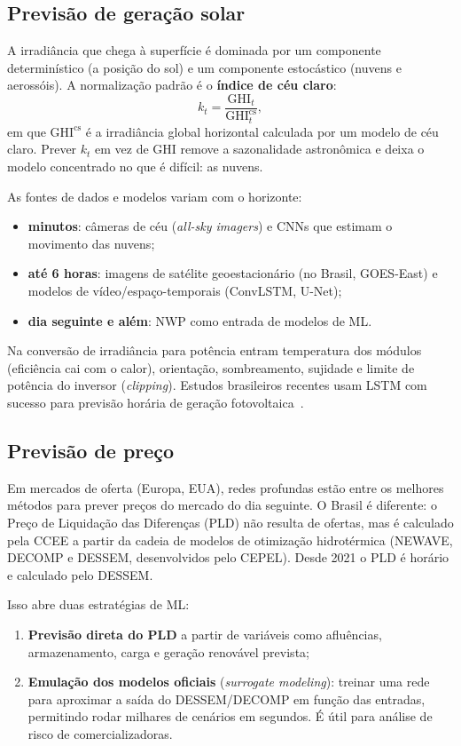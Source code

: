 \documentclass[11pt,a4paper]{article}
\begin{document}
\subsection{Previsão de geração solar}

A irradiância que chega à superfície é dominada por um componente
determinístico (a posição do sol) e um componente estocástico (nuvens e
aerossóis). A normalização padrão é o \textbf{índice de céu claro}:
\begin{equation}
  k_t = \frac{\mathrm{GHI}_t}{\mathrm{GHI}^{\mathrm{cs}}_t},
\end{equation}
em que $\mathrm{GHI}^{\mathrm{cs}}$ é a irradiância global horizontal
calculada por um modelo de céu claro. Prever $k_t$ em vez de GHI remove a
sazonalidade astronômica e deixa o modelo concentrado no que é difícil: as
nuvens.

As fontes de dados e modelos variam com o horizonte:
\begin{itemize}
  \item \textbf{minutos}: câmeras de céu (\textit{all-sky imagers}) e CNNs que
    estimam o movimento das nuvens;
  \item \textbf{até 6 horas}: imagens de satélite geoestacionário (no Brasil,
    GOES-East) e modelos de vídeo/espaço-temporais (ConvLSTM, U-Net);
  \item \textbf{dia seguinte e além}: NWP como entrada de modelos de ML.
\end{itemize}

Na conversão de irradiância para potência entram temperatura dos módulos
(eficiência cai com o calor), orientação, sombreamento, sujidade e limite de
potência do inversor (\textit{clipping}). Estudos brasileiros recentes usam
LSTM com sucesso para previsão horária de geração fotovoltaica~\cite{pvlstm}.

\subsection{Previsão de preço}

Em mercados de oferta (Europa, EUA), redes profundas estão entre os melhores
métodos para prever preços do mercado do dia seguinte. O Brasil é diferente: o
Preço de Liquidação das Diferenças (PLD) não resulta de ofertas, mas é
calculado pela CCEE a partir da cadeia de modelos de otimização
hidrotérmica (NEWAVE, DECOMP e DESSEM, desenvolvidos pelo CEPEL). Desde 2021 o
PLD é horário e calculado pelo DESSEM.

Isso abre duas estratégias de ML:
\begin{enumerate}
  \item \textbf{Previsão direta do PLD} a partir de variáveis como afluências,
    armazenamento, carga e geração renovável prevista;
  \item \textbf{Emulação dos modelos oficiais} (\textit{surrogate modeling}):
    treinar uma rede para aproximar a saída do DESSEM/DECOMP em função das
    entradas, permitindo rodar milhares de cenários em segundos. É útil para
    análise de risco de comercializadoras.
\end{enumerate}
\end{document}

